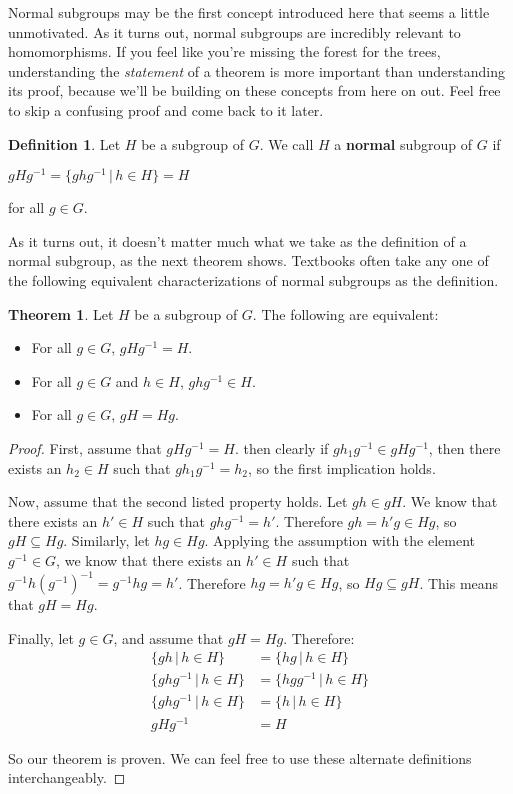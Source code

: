 \documentclass[12pt]{article}
\newcommand{\inv}[1]{#1^{-1}}
\theoremstyle{definition}
\newtheorem{definition}{Definition}[section]
\newtheorem{theorem}{Theorem}[section]
\newenvironment{thm}
{\theoremstyle{definition}
\begin{theorem}}
{\end{theorem}}
\newenvironment{defn}[1][]
{\theoremstyle{definition}
\begin{definition}{}}
{\end{definition}}
\begin{document}
Normal subgroups may be the first concept introduced here that seems a little unmotivated. As it turns out, normal subgroups are incredibly relevant to homomorphisms. If you feel like you're missing the forest for the trees, understanding the \textit{statement} of a theorem is more important than understanding its proof, because we'll be building on these concepts from here on out. Feel free to skip a confusing proof and come back to it later.

\begin{defn}
Let $H$ be a subgroup of $G$. We call $H$ a \textbf{normal} subgroup of $G$ if
\begin{center}
    $gH\inv{g} = \{gh\inv{g} \,|\, h \in H\} = H$
\end{center}
for all $g \in G$.
\end{defn}

As it turns out, it doesn't matter much what we take as the definition of a normal subgroup, as the next theorem shows. Textbooks often take any one of the following equivalent characterizations of normal subgroups as the definition.

\begin{thm}
Let $H$ be a subgroup of $G$. The following are equivalent:
\begin{itemize}
\item For all $g \in G$, $gH\inv{g} = H$.
\item For all $g \in G$ and $h \in H$, $gh\inv{g} \in H$.
\item For all $g \in G$, $gH = Hg$.
\end{itemize}
\end{thm}

\begin{proof}
First, assume that $gH\inv{g} = H$. then clearly if $gh_1\inv{g} \in gH\inv{g}$, then there exists an $h_2 \in H$ such that $gh_1\inv{g} = h_2$, so the first implication holds.

Now, assume that the second listed property holds. Let $gh \in gH$. We know that there exists an $h' \in H$ such that $gh\inv{g} = h'$. Therefore $gh = h'g \in Hg$, so $gH \subseteq Hg$. Similarly, let $hg \in Hg$. Applying the assumption with the element $\inv{g} \in G$, we know that there exists an $h' \in H$ such that $\inv{g}h\left(\inv{g}\right)^{-1} = \inv{g}hg = h'$. Therefore $hg = h'g \in Hg$, so $Hg \subseteq gH$. This means that $gH = Hg$.

Finally, let $g \in G$, and assume that $gH = Hg$. Therefore:
\begin{align*}
    \{gh \,|\, h \in H\} &= \{hg \,|\, h \in H\} \\
    \{ghg^{-1} \,|\, h \in H\} &= \{hgg^{-1} \,|\, h \in H\} \\
    \{ghg^{-1} \,|\, h \in H\} &= \{h \,|\, h \in H\} \\
    gHg^{-1} &= H
\end{align*}

So our theorem is proven. We can feel free to use these alternate definitions interchangeably.

\end{proof}
\end{document}
